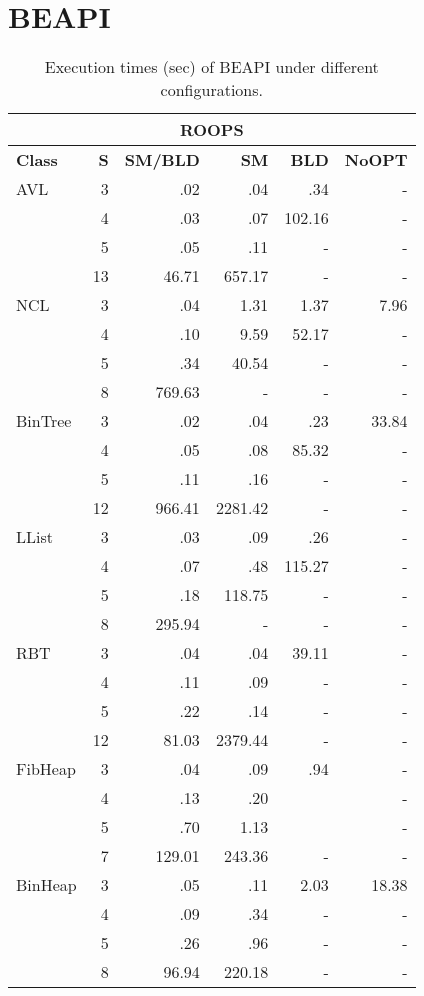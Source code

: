 \section{BEAPI}
\begin{table}[!thb]
\scriptsize
\centering
\caption{Execution times (sec) of BEAPI under different configurations.}

\begin{tabular}{ l r | r | r | r | r  }
  \toprule
  \multicolumn{6}{c}{\textbf{ROOPS}} \\
  \midrule 
  \textbf{Class} & \textbf{S} & \textbf{SM/BLD} & \textbf{SM}  & \textbf{BLD} & \textbf{NoOPT}  \\
  \midrule
  AVL
  & 3& .02 & .04 & .34 & - \\ 
  & 4& .03 & .07 & 102.16 & - \\ 
  & 5& .05 & .11 & - & - \\ 
  & 13& 46.71 & 657.17 & - & - \\ 
  \midrule
  NCL
  & 3& .04 & 1.31 & 1.37 & 7.96 \\ 
  & 4& .10 & 9.59 & 52.17 & - \\ 
  & 5& .34 & 40.54 & - & - \\ 
  & 8& 769.63 & - & - &  -\\ 
  \midrule
  BinTree
  & 3& .02 & .04 & .23 & 33.84 \\ 
  & 4& .05 & .08 & 85.32 & - \\ 
  & 5& .11 & .16 & - & - \\ 
  & 12& 966.41 & 2281.42 & - & - \\ 
  \midrule
  LList
  & 3& .03 & .09 & .26 & - \\ 
  & 4& .07 & .48 & 115.27 & - \\ 
  & 5& .18 & 118.75 & - & - \\ 
  & 8& 295.94 & - & - & - \\ 
  \midrule
  RBT
  & 3& .04 & .04 & 39.11 & - \\ 
  & 4& .11 & .09 & - & - \\ 
  & 5& .22 & .14 & - & - \\ 
  & 12& 81.03 & 2379.44 & - & - \\ 
  \midrule
  FibHeap
  & 3& .04 & .09 & .94 & - \\ 
  & 4& .13 & .20 &  & - \\ 
  & 5& .70 & 1.13 &  & - \\ 
  & 7& 129.01 & 243.36 & - & - \\ 
  \midrule
  BinHeap
  & 3& .05 & .11 & 2.03 & 18.38 \\ 
  & 4& .09 & .34 & - & - \\ 
  & 5& .26 & .96 & - & - \\  
  & 8& 96.94 & 220.18 & - & - \\ 
  \bottomrule
\end{tabular}
\end{table}

